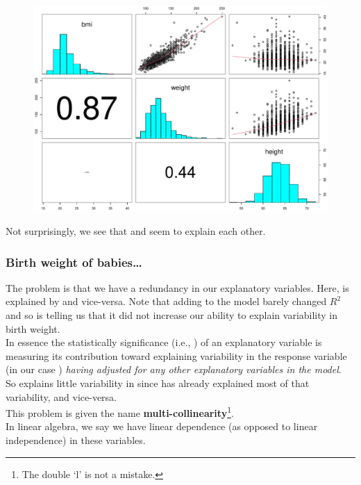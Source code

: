 \documentclass{beamer}\usepackage[]{graphicx}\usepackage[]{xcolor}
\makeatletter
\newenvironment{kframe}{%
 \def\at@end@of@kframe{}%
 \ifinner\ifhmode%
  \def\at@end@of@kframe{\end{minipage}}%
  \begin{minipage}{\columnwidth}%
 \fi\fi%
 \def\FrameCommand##1{\hskip\@totalleftmargin \hskip-\fboxsep
 \colorbox{shadecolor}{##1}\hskip-\fboxsep
     \hskip-\linewidth \hskip-\@totalleftmargin \hskip\columnwidth}%
 \MakeFramed {\advance\hsize-\width
   \@totalleftmargin\z@ \linewidth\hsize
   \@setminipage}}%
 {\par\unskip\endMakeFramed%
 \at@end@of@kframe}
\newenvironment{knitrout}{}{} %
\makeatother
\begin{document}
\begin{frame}[fragile]
\begin{knitrout}
\begin{kframe}
{\ttfamily\noindent\color{warningcolor}{Warning in par(usr): argument 1 does not name a graphical parameter}}\end{kframe}
\end{knitrout}

\begin{figure}
  \centering
  \includegraphics[scale = 0.35]{figure/RC-H10-042}
\end{figure}

Not surprisingly, we see that  and  seem to explain each other.
\end{frame}


\begin{frame}[fragile]
\frametitle{Birth weight of babies\ldots}
The problem is that we have a redundancy in our explanatory variables.
Here,  is explained by  and vice-versa.
Note that adding  to the model barely changed $R^2$ and so is telling us that it did not increase our ability to explain variability in birth weight.\\
\medskip
In essence the statistically significance (i.e., \pval{}) of an explanatory
variable is measuring its contribution toward explaining variability in the response variable (in our case )
\emph{having adjusted for any other explanatory variables in the model}.\\
\medskip
So  explains little variability in  since  has already
explained most of that variability, and vice-versa.\\
\medskip
This problem is given the name \textbf{multi-collinearity}\footnote{The double `l' is not a mistake.}.\\
\medskip
In linear algebra, we say we have linear dependence (as opposed to linear independence) in these variables.
\end{frame}
\end{document}
